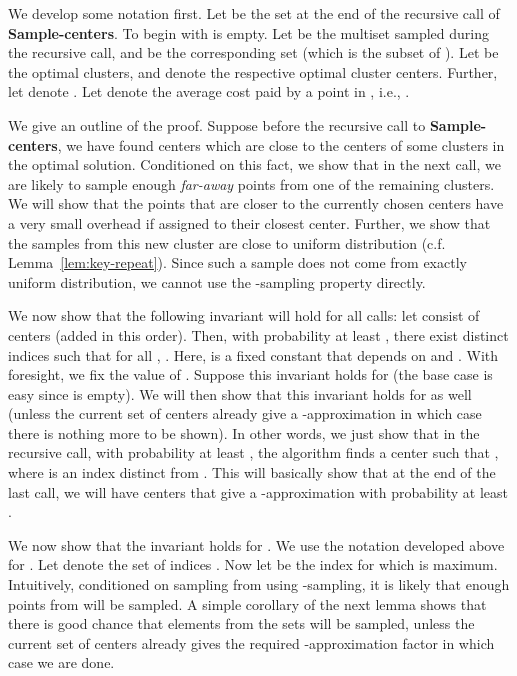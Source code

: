\documentclass[11pt]{article}
\begin{document}
We develop some notation first. 
Let  be the set  at the end of the  recursive call of {\bf Sample-centers}.
To begin with  is empty. 
Let  be the multiset  sampled during the  recursive call, and  be the corresponding set  (which is the  subset of ).
Let  be the optimal clusters, and  denote the respective optimal cluster centers. 
Further, let  denote .
Let  denote the average cost paid by a point in , i.e.,
.


We give an outline of the proof. 
Suppose before the   recursive call to {\bf Sample-centers}, 
we have found centers which are close to the centers of some  clusters in the optimal solution. 
Conditioned on this fact, we show that in the next call, we are likely to sample enough {\em far-away} points from one of the remaining clusters.
We will show that the points that are closer to the currently chosen centers have a very small overhead if assigned to their closest center.
Further, we show that the samples from this new cluster are close to uniform distribution (c.f. Lemma~\ref{lem:key-repeat}). 
Since such a sample does not come from exactly uniform distribution, we cannot use the -sampling property directly. 

We now show that the following invariant will hold for all calls: let  consist of centers
 (added in this order). 
Then, with probability at least , there exist distinct indices  such that for all , .
Here,  is a fixed constant that depends on  and . With foresight, we fix the value of .
Suppose this invariant holds for  (the base case is easy since  is empty).
We will then show that this invariant holds for  as well (unless the current set of centers already give a -approximation in which case there is nothing more to be shown). 
In other words, we just show that in the  recursive call, with probability at least ,  the algorithm finds a center   such that
, where  is an index distinct from
.
This will basically show that at the end of the last call, we will have  centers that give a -approximation with probability at least .


We now show that the invariant holds for . We use the notation developed above for . 
Let  denote the set of indices . 
Now let  be the index  for which 
is maximum. 
Intuitively, conditioned on sampling from  using -sampling, it is  likely that
enough points from  will be sampled.
A simple corollary of the next lemma shows that there is good chance that elements from the sets  will be sampled, unless the current set of centers already gives the required -approximation factor in which case we are done.
\end{document}
